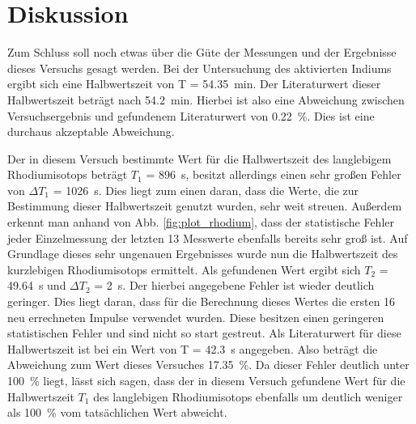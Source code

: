
\section{Diskussion}

Zum Schluss soll noch etwas über die Güte der Messungen und der Ergebnisse dieses Versuchs gesagt werden.
Bei der Untersuchung des aktivierten Indiums ergibt sich eine Halbwertszeit von T = \SI{54.35}{\minute}. Der Literaturwert dieser Halbwertszeit beträgt nach \textcite{chemglobe} \SI{54.2}{\minute}. Hierbei ist also eine Abweichung zwischen Versuchsergebnis und gefundenem Literaturwert von \SI{0.22}{\percent}. Dies ist eine durchaus akzeptable Abweichung.

Der in diesem Versuch bestimmte Wert für die Halbwertszeit des langlebigem Rhodiumisotops beträgt $T_1$ = \SI{896}{\second}, besitzt allerdings einen sehr großen Fehler von $\Delta T_1$ = \SI{1026}{\second}. Dies liegt zum einen daran, dass die Werte, die zur Bestimmung dieser Halbwertszeit genutzt wurden, sehr weit streuen. Außerdem erkennt man anhand von Abb. \ref{fig:plot_rhodium}, dass der statistische Fehler jeder Einzelmessung der letzten 13 Messwerte ebenfalls bereits sehr groß ist.
Auf Grundlage dieses sehr ungenauen Ergebnisses wurde nun die Halbwertszeit des kurzlebigen Rhodiumisotops ermittelt. Als gefundenen Wert ergibt sich $T_2$ = \SI{49.64}{\second} und $\Delta T_2$ = \SI{2}{\second}. Der hierbei angegebene Fehler ist wieder deutlich geringer. Dies liegt daran, dass für die Berechnung dieses Wertes die ersten 16 neu errechneten Impulse verwendet wurden. Diese besitzen einen geringeren statistischen Fehler und sind nicht so start gestreut. Als Literaturwert für diese Halbwertszeit ist bei \textcite{periodensystem} ein Wert von T = \SI{42.3}{\second} angegeben. Also beträgt die Abweichung zum Wert dieses Versuches \SI{17.35}{\percent}. Da dieser Fehler deutlich unter \SI{100}{\percent} liegt, lässt sich sagen, dass der in diesem Versuch gefundene Wert für die Halbwertszeit $T_1$ des langlebigen Rhodiumisotops ebenfalls um deutlich weniger als \SI{100}{\percent} vom tatsächlichen Wert abweicht.